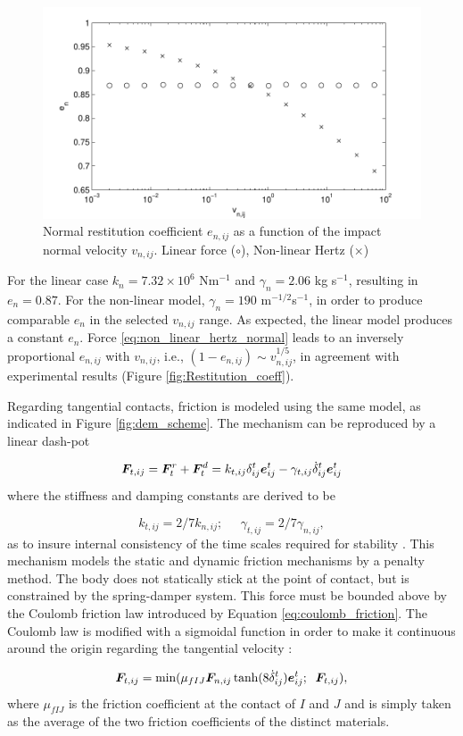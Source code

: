%
\begin{figure}[ht!]
	\centering
	\includegraphics[width=0.80\linewidth]{Figures/3.Chapter/e_hertz}
	\caption{Normal restitution coefficient $e_{n,ij}$ as a function of the impact normal velocity $v_{n,ij}$. Linear force ($\circ$), Non-linear Hertz ($\times$)}
	\label{fig:e_hertz} 
\end{figure}
%
For the linear case $k_n=7.32\times10^6$ Nm$^{-1}$ and $\gamma_n=2.06$ kg s$^{-1}$, resulting in $e_n=0.87$. For the non-linear model, $\gamma_n=190$ m$^{-1/2}$s$^{-1}$, in order to produce comparable $e_n$ in the selected $v_{n,ij}$ range. As expected, the linear model produces a constant $e_n$. Force \eqref{eq:non_linear_hertz_normal} leads to an inversely proportional $e_{n,ij}$ with $v_{n,ij}$, i.e., $(1-e_{n,ij})\sim v_{n,ij}^{1/5}$, in agreement with experimental results (Figure \ref{fig:Restitution_coeff}).


Regarding tangential contacts, friction is modeled using the same model, as indicated in Figure \ref{fig:dem_scheme}. The mechanism can be reproduced by a linear dash-pot 

%
\begin{equation} \label{eq:elastic_fric}
	\boldsymbol{F}_{t,ij}=\boldsymbol{F}_t^r+\boldsymbol{F}_t^d=k_{t,ij}\delta^t_{ij}\boldsymbol{e}^t_{ij}-\gamma_{t,ij}\dot{\delta}^t_{ij}\boldsymbol{e}^t_{ij}
\end{equation}
%
where the stiffness and damping constants are derived to be

%
\begin{equation} \label{eq:fric_coeffs}
	k_{t,ij}=2/7k_{n,ij}; \;\;\;\;\; \gamma_{t,ij}=2/7\gamma_{n,ij},
\end{equation}
%
as to insure internal consistency of the time scales required for stability \citep{Hoomans-2000}. This mechanism models the static and dynamic friction mechanisms by a penalty method. The body does not statically stick at the point of contact, but is constrained by the spring-damper system. This force must be bounded above by the Coulomb friction law introduced by Equation \eqref{eq:coulomb_friction}. The Coulomb law is modified with a sigmoidal function in order to make it continuous around the origin regarding the tangential velocity \citep{Vetsch-2011}:

%
\begin{equation} \label{eq:fric_I}
	\boldsymbol{F}_{t,ij}=\min(\mu_{fIJ} \boldsymbol{F}_{n,ij} \tanh (8\dot{\delta}^t_{ij})\boldsymbol{e}^t_{ij};\;\; \boldsymbol{F}_{t,ij}),
\end{equation}
%
\noindent where $\mu_{fIJ}$ is the friction coefficient at the contact of $I$ and $J$ and is simply taken as the average of the two friction coefficients of the distinct materials.